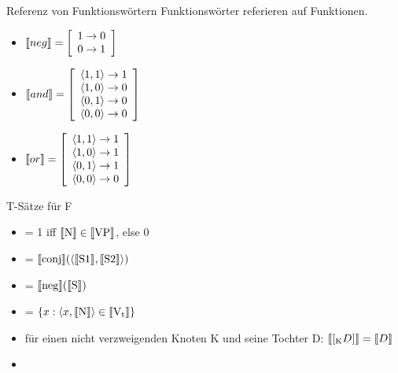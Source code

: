 \begin{frame}
  {Referenz von Funktionswörtern}
  Funktionswörter referieren auf \alert{Funktionen}.\\
  \Zeile
  \begin{itemize}[<+->]
    \item ${\llbracket{}neg\rrbracket} = \left[
                       \begin{array}{l}
                                1 \rightarrow 0\\
                                0 \rightarrow 1
                       \end{array}
                     \right]$ \label{fint01}
    \item ${\llbracket{}and\rrbracket} = \left[
                       \begin{array}{l}
                                \langle 1,1 \rangle \rightarrow 1\\
                                \langle 1,0 \rangle \rightarrow 0\\
                                \langle 0,1 \rangle \rightarrow 0\\
                                \langle 0,0 \rangle \rightarrow 0
                       \end{array}
                       \right]$ \label{fint02}
    \item ${\llbracket{}or\rrbracket} = \left[
                           \begin{array}{l}
                                    \langle 1,1 \rangle \rightarrow 1\\
                                    \langle 1,0 \rangle \rightarrow 1\\
                                    \langle 0,1 \rangle \rightarrow 1\\
                                    \langle 0,0 \rangle \rightarrow 0
                           \end{array}
                           \right]$ \label{fint03}
  \end{itemize}
\end{frame}

\begin{frame}
  {T-Sätze für F}
  \begin{itemize}[<+->]
    \item \den{\alert{[\Sub{S}{ }N{ }VP]}} = 1 iff $\llbracket\text{N}\rrbracket\in\llbracket\text{VP}\rrbracket$, else $0$ \label{t01}
    \item {} = $\llbracket\text{conj}\rrbracket(\langle\llbracket\text{S1}\rrbracket,\llbracket\text{S2}\rrbracket\rangle)$ \label{t02}
    \item {} = $\llbracket\text{neg}\rrbracket(\llbracket\text{S}\rrbracket)$ \label{t03}
    \item {} = $\{x:\langle x,\llbracket\text{N}\rrbracket\rangle\in\llbracket\text{V\ensuremath{_{\text{t}}}}\rrbracket\}$ \label{t04}
      \Halbzeile
    \item für einen nicht verzweigenden Knoten K und seine Tochter D: ${\llbracket{}[_{\text{K}} D]\rrbracket}={\llbracket{}D\rrbracket}$ \label{t05}
      \Halbzeile
    \item {}
  \end{itemize}
\end{frame}

